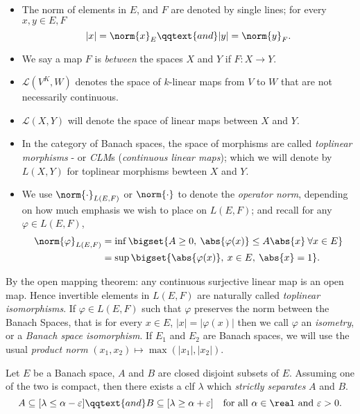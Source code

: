 \documentclass[../main-v2-manifolds.tex]{subfiles}
\begin{document}
\begin{itemize}
    \item The norm of elements in $E$, and $F$ are denoted by single lines; for every $x,y\in E,F$
    \[
        \vert x\vert = \norm{x}_E \qqtext{and} \vert y\vert = \norm{y}_F.
    \]
    \item We say a map $F$ is \emph{between} the spaces $X$ and $Y$ if $F: X\to Y$. 
    \item $\mathcal{L}(V^K,W)$ denotes the space of $k$-linear maps from $V$ to $W$ that are not necessarily continuous. 
    \item $\mathcal{L}(X,Y)$ will denote the space of linear maps between $X$ and $Y$. 
    \item In the category of Banach spaces, the space of morphisms are called \emph{toplinear morphisms} - or \emph{CLM}s (\emph{continuous linear maps}); which we will denote by $L(X,Y)$ for toplinear morphisms bewteen $X$ and $Y$.
    \item We use $\norm{\cdot}_{L(E,F)}$ or $\norm{\cdot}$ to denote the \emph{operator norm}, depending on how much emphasis we wish to place on $L(E,F)$; and recall for any $\varphi\in L(E,F)$,
    \begin{align*}
        \norm{\varphi}_{L(E,F)} &= \inf\bigset{A\geq 0,\: \abs{\varphi(x)}\leq A\abs{x}\:\forall x\in E} \\
        &= \sup\bigset{\abs{\varphi(x)},\: x\in E,\: \abs{x}=1}. 
    \end{align*}
\end{itemize}


By the open mapping theorem: any continuous surjective linear map is an open map. Hence invertible elements in $L(E,F)$ are naturally called \emph{toplinear isomorphisms}. If $\varphi\in L(E,F)$ such that $\varphi$ preserves the norm between the Banach Spaces, that is for every $x\in E$, $\vert x\vert = \vert \varphi(x)\vert$ then we call $\varphi$ an \emph{isometry}, or a \emph{Banach space isomorphism}. If $E_1$ and $E_2$ are Banach spaces, we will use the usual \emph{product norm} $(x_1, x_2)\mapsto \max(\vert x_1\vert,\vert x_2\vert)$. 

\begin{wts}\label{prop:hahn-banach-geometric-form}
    Let $E$ be a Banach space, $A$ and $B$ are closed disjoint subsets of $E$. Assuming one of the two is compact, then there exists a clf $\lambda$ which \emph{strictly separates} $A$ and $B$. 
    \begin{equation}\label{eq:hahn-banach-geometric-form}
        A\subseteq [\lambda \leq \alpha-\varepsilon]\qqtext{and} B\subseteq [\lambda\geq\alpha + \varepsilon]\quad\text{for all }\alpha\in\real \text{ and } \varepsilon>0.
    \end{equation}
\end{wts}
\end{document}

